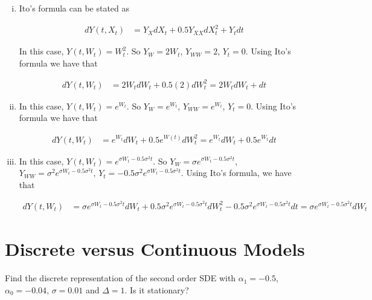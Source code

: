 \documentclass{article}
\numberwithin{questioncounter}{section}
\begin{document}
\begin{solution}
\begin{enumerate}[(i)]
\item Ito's formula can be stated as 

\begin{align*}
dY(t, X_{t}) &= Y_{X} dX_{t} + 0.5 Y_{XX} dX_{t}^2 + Y_{t}dt
\end{align*}

In this case, $Y(t, W_t) = W_{t}^2$. So $Y_{W} = 2W_{t}$, $Y_{WW} = 2$, $Y_{t} = 0$. Using Ito's formula we have that

\begin{align*}
dY(t, W_{t}) &= 2W_{t}dW_{t} + 0.5(2) dW_{t}^2 = 2W_{t} dW_{t} + dt
\end{align*}

\item In this case, $Y(t, W_{t}) = e^{W_{t}}$. So $Y_{W} = e^{W_{t}}$, $Y_{WW} = e^{W_{t}}$, $Y_{t} = 0$. Using Ito's formula we have that

\begin{align*}
dY(t, W_{t}) &= e^{W_{t}} dW_{t} + 0.5 e^{W(t)} dW_{t}^2 = e^{W_{t}} dW_{t} + 0.5 e^{W_{t}} dt
\end{align*}

\item In this case, $Y(t, W_{t}) = e^{\sigma W_{t} - 0.5 \sigma^2 t}$. So $Y_{W} = \sigma e^{\sigma W_{t} - 0.5 \sigma^2 t}$, $Y_{WW} = \sigma^2 e^{\sigma W_{t} - 0.5\sigma^2 t}$, $Y_{t} = - 0.5\sigma^2 e^{\sigma W_{t} - 0.5\sigma^2 t}$. Using Ito's formula, we have that

\begin{align*}
dY(t, W_{t}) &= \sigma e^{\sigma W_{t} - 0.5 \sigma^2 t} dW_{t} + 0.5 \sigma^2 e^{\sigma W_{t} - 0.5\sigma^2 t} dW_{t}^2 - 0.5\sigma^2 e^{\sigma W_{t} - 0.5\sigma^2 t} dt = \sigma e^{\sigma W_{t} - 0.5 \sigma^2 t} dW_{t}
\end{align*}

\end{enumerate}
\end{solution}

\newpage
\setcounter{section}{4}
\section{Discrete versus Continuous Models}

\begin{question}
Find the discrete representation of the second order SDE with $\alpha_{1} = -0.5$, $\alpha_{0} = -0.04$, $\sigma = 0.01$ and $\Delta = 1$. Is it stationary?
\end{question}
\end{document}
